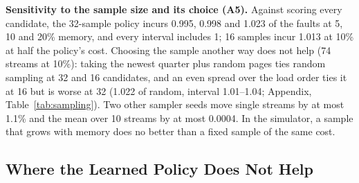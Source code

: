 \documentclass{article}
\newcommand{\finding}[1]{\textbf{#1}\hspace{0.4em}}
\begin{document}
\finding{Sensitivity to the sample size and its choice (A5).} Against scoring every candidate, the 32-sample
policy incurs 0.995, 0.998 and 1.023 of the faults at 5, 10 and 20\% memory, and every
interval includes 1; 16 samples incur 1.013 at 10\% at half the policy's cost. Choosing
the sample another way does not help (74 streams at 10\%): taking the newest quarter plus
random pages ties random sampling at 32 and 16 candidates, and an even spread over the load
order ties it at 16 but is worse at 32 (1.022 of random, interval 1.01--1.04;
Appendix, Table~\ref{tab:sampling}). Two other sampler seeds move single streams by at
most 1.1\% and the mean over 10 streams by at most 0.0004. In the simulator, a sample that
grows with memory does no better than a fixed sample of the same cost.

\subsection{Where the Learned Policy Does Not Help}
\label{sec:eval-loss}
\end{document}
